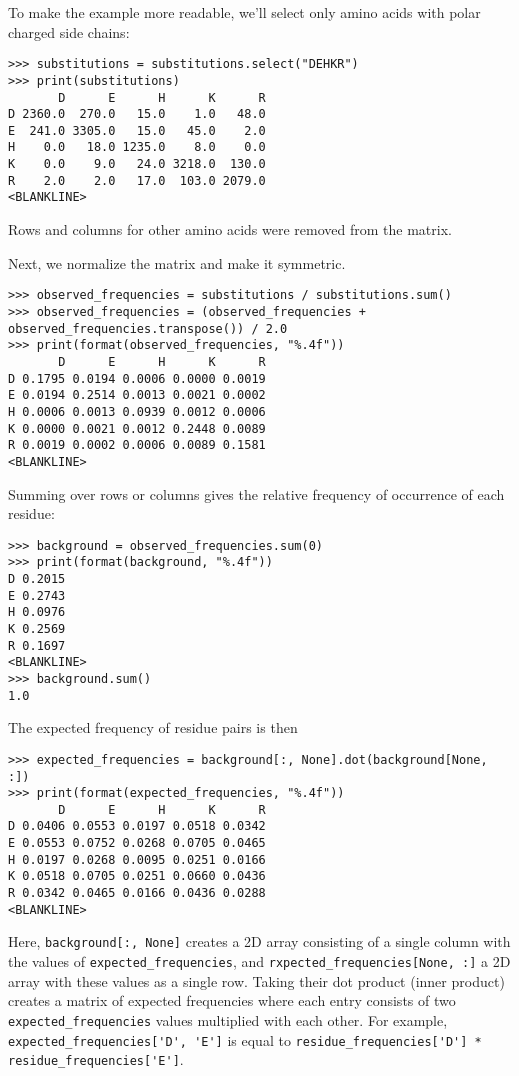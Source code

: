 To make the example more readable, we'll select only amino acids with polar charged side chains:

\begin{verbatim}
>>> substitutions = substitutions.select("DEHKR")
>>> print(substitutions)
       D      E      H      K      R
D 2360.0  270.0   15.0    1.0   48.0
E  241.0 3305.0   15.0   45.0    2.0
H    0.0   18.0 1235.0    8.0    0.0
K    0.0    9.0   24.0 3218.0  130.0
R    2.0    2.0   17.0  103.0 2079.0
<BLANKLINE>
\end{verbatim}
Rows and columns for other amino acids were removed from the matrix.

Next, we normalize the matrix and make it symmetric.
\begin{verbatim}
>>> observed_frequencies = substitutions / substitutions.sum()
>>> observed_frequencies = (observed_frequencies + observed_frequencies.transpose()) / 2.0
>>> print(format(observed_frequencies, "%.4f"))
       D      E      H      K      R
D 0.1795 0.0194 0.0006 0.0000 0.0019
E 0.0194 0.2514 0.0013 0.0021 0.0002
H 0.0006 0.0013 0.0939 0.0012 0.0006
K 0.0000 0.0021 0.0012 0.2448 0.0089
R 0.0019 0.0002 0.0006 0.0089 0.1581
<BLANKLINE>
\end{verbatim}

Summing over rows or columns gives the relative frequency of occurrence of
each residue:
\begin{verbatim}
>>> background = observed_frequencies.sum(0)
>>> print(format(background, "%.4f"))
D 0.2015
E 0.2743
H 0.0976
K 0.2569
R 0.1697
<BLANKLINE>
>>> background.sum()
1.0
\end{verbatim}

The expected frequency of residue pairs is then
\begin{verbatim}
>>> expected_frequencies = background[:, None].dot(background[None, :])
>>> print(format(expected_frequencies, "%.4f"))
       D      E      H      K      R
D 0.0406 0.0553 0.0197 0.0518 0.0342
E 0.0553 0.0752 0.0268 0.0705 0.0465
H 0.0197 0.0268 0.0095 0.0251 0.0166
K 0.0518 0.0705 0.0251 0.0660 0.0436
R 0.0342 0.0465 0.0166 0.0436 0.0288
<BLANKLINE>
\end{verbatim}
Here, \verb+background[:, None]+ creates a 2D array consisting of a single column with the values of \verb+expected_frequencies+, and \verb+rxpected_frequencies[None, :]+ a 2D array with these values as a single row. Taking their dot product (inner product) creates a matrix of expected frequencies where each entry consists of two \verb+expected_frequencies+ values multiplied with each other. For example, \verb+expected_frequencies['D', 'E']+ is equal to \verb+residue_frequencies['D'] * residue_frequencies['E']+.

